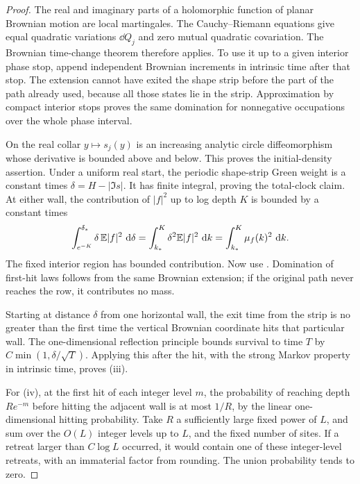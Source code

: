 \begin{proof}
The real and imaginary parts of a holomorphic function of planar Brownian
motion are local martingales.  The Cauchy--Riemann equations give equal
quadratic variations \(\dd Q_j\) and zero mutual quadratic covariation.
The Brownian time-change theorem therefore applies.  To use it up to a
given interior phase stop, append independent Brownian increments in
intrinsic time after that stop.  The extension cannot have exited the
shape strip before the part of the path already used, because all those
states lie in the strip.  Approximation by compact interior stops proves
the same domination for nonnegative occupations over the whole phase
interval.

On the real collar \(y\mapsto s_j(y)\) is an increasing analytic circle
diffeomorphism whose derivative is bounded above and below.  This proves
the initial-density assertion.  Under a uniform real start, the periodic
shape-strip Green weight is a constant times
\(\delta=H-|\Im s|\).  It has finite integral, proving the total-clock
claim.  At either wall, the contribution of \(|f|^2\) up to log depth
\(K\) is bounded by a constant times
\[
 \int_{e^{-K}}^{\delta_*}\delta\,\mathbb E|f|^2\,\,\mathrm d\delta
   =\int_{k_*}^{K}\delta^2\mathbb E|f|^2\,\,\mathrm d k
   =\int_{k_*}^{K}\mu_f(k)^2\,\,\mathrm d k.
\]
The fixed interior region has bounded contribution.  Now use
.  Domination of first-hit laws follows from the
same Brownian extension; if the original path never reaches the row,
it contributes no mass.

Starting at distance \(\delta\) from one horizontal wall, the exit time
from the strip is no greater than the first time the vertical Brownian
coordinate hits that particular wall.  The one-dimensional reflection
principle bounds survival to time \(T\) by
\(C\min(1,\delta/\sqrt T)\).  Applying this after the hit, with the
strong Markov property in intrinsic time, proves (iii).

For (iv), at the first hit of each integer level \(m\), the probability
of reaching depth \(R e^{-m}\) before hitting the adjacent wall is at
most \(1/R\), by the linear one-dimensional hitting probability.  Take
\(R\) a sufficiently large fixed power of \(L\), and sum over the
\(O(L)\) integer levels up to \(L\), and the fixed number of sites.
If a retreat larger than \(C\log L\) occurred, it would contain one of
these integer-level retreats, with an immaterial factor from rounding.
The union probability tends to zero.
\end{proof}

